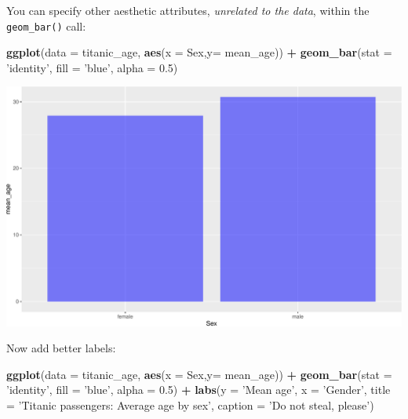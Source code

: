 \documentclass[
]{book}
\newenvironment{Shaded}{\begin{snugshade}}{\end{snugshade}}
\newcommand{\DataTypeTok}[1]{\textcolor[rgb]{0.13,0.29,0.53}{#1}}
\newcommand{\FloatTok}[1]{\textcolor[rgb]{0.00,0.00,0.81}{#1}}
\newcommand{\KeywordTok}[1]{\textcolor[rgb]{0.13,0.29,0.53}{\textbf{#1}}}
\newcommand{\NormalTok}[1]{#1}
\newcommand{\OperatorTok}[1]{\textcolor[rgb]{0.81,0.36,0.00}{\textbf{#1}}}
\newcommand{\StringTok}[1]{\textcolor[rgb]{0.31,0.60,0.02}{#1}}
\begin{document}
You can specify other aesthetic attributes, \emph{unrelated to the data}, within the \texttt{geom\_bar()} call:

\begin{Shaded}
\begin{Highlighting}[]
\KeywordTok{ggplot}\NormalTok{(}\DataTypeTok{data =}\NormalTok{ titanic_age, }
       \KeywordTok{aes}\NormalTok{(}\DataTypeTok{x =}\NormalTok{ Sex,}\DataTypeTok{y=}\NormalTok{ mean_age)) }\OperatorTok{+}\StringTok{ }
\StringTok{  }\KeywordTok{geom_bar}\NormalTok{(}\DataTypeTok{stat =} \StringTok{'identity'}\NormalTok{, }\DataTypeTok{fill =} \StringTok{'blue'}\NormalTok{, }\DataTypeTok{alpha =} \FloatTok{0.5}\NormalTok{) }
\end{Highlighting}
\end{Shaded}

\includegraphics{figures/unnamed-chunk-257-1.pdf}

Now add better labels:

\begin{Shaded}
\begin{Highlighting}[]
\KeywordTok{ggplot}\NormalTok{(}\DataTypeTok{data =}\NormalTok{ titanic_age, }
       \KeywordTok{aes}\NormalTok{(}\DataTypeTok{x =}\NormalTok{ Sex,}\DataTypeTok{y=}\NormalTok{ mean_age)) }\OperatorTok{+}\StringTok{ }
\StringTok{  }\KeywordTok{geom_bar}\NormalTok{(}\DataTypeTok{stat =} \StringTok{'identity'}\NormalTok{, }\DataTypeTok{fill =} \StringTok{'blue'}\NormalTok{, }\DataTypeTok{alpha =} \FloatTok{0.5}\NormalTok{) }\OperatorTok{+}\StringTok{ }
\StringTok{  }\KeywordTok{labs}\NormalTok{(}\DataTypeTok{y =} \StringTok{'Mean age'}\NormalTok{, }
       \DataTypeTok{x =} \StringTok{'Gender'}\NormalTok{,}
       \DataTypeTok{title =} \StringTok{'Titanic passengers: Average age by sex'}\NormalTok{,}
       \DataTypeTok{caption =} \StringTok{'Do not steal, please'}\NormalTok{)}
\end{Highlighting}
\end{Shaded}
\end{document}
